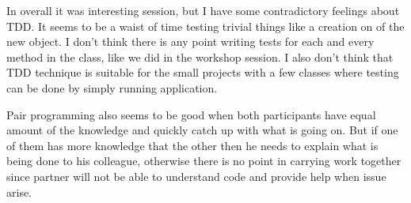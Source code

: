 \documentclass[]{report}
\begin{document}
In overall it was interesting session, but I  have some contradictory feelings about TDD. It seems to be a waist of time testing trivial things like a creation on of the new object. I don't think there is any point writing tests for each and every method in the class, like we did in the workshop session. I also don't think that TDD technique is suitable for the small projects with a few classes where testing can be done by simply running application. 

Pair programming also seems to be good when both participants have equal amount of the knowledge and quickly catch up with what is going on. But if one of them has more knowledge that the other then he needs to explain what is being done to his colleague, otherwise there is no point in carrying work together since partner will not be able to understand code and provide help when issue arise.  



\end{document}
